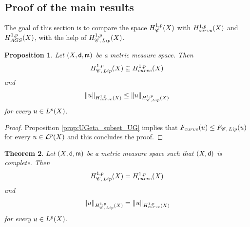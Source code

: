 \documentclass[12pt]{amsart}
\newcommand{\sfd}{{\sf d}}
\newcommand{\X}{{\rm X}}
\newcommand{\Lip}{{\rm Lip}}
\newcommand{\mm}{\mathfrak m}
\newcommand{\F}{{\rm F}}
\newtheorem{theorem}{Theorem}[section]
\newtheorem{proposition}[theorem]{Proposition}
\theoremstyle{definition}
\newcommand{\Chain}[1]{\mathscr{C}^{#1}}
\newcommand{\calL}[1]{\mathcal{L}^{#1}}
\newcommand{\HH}[2]{H^{1,#1}_{{\rm #2}}}
\renewcommand{\F}[1]{{\rm F}_{{\rm #1}}}
\begin{document}
\subsection{Proof of the main results}
\label{sec:proof_main_result}
The goal of this section is to compare the space $\HH{p}{\Chain{}}(\X)$ with $\HH{p}{curve}(\X)$ and $\HH{p}{AGS}(\X)$, with the help of $\HH{p}{\Chain{},\,\Lip}(\X)$.
\begin{proposition}
\label{prop:equivalence_H_noncomplete}
    Let $(\X,\sfd,\mm)$ be a metric measure space. Then 
    \begin{equation}
        \HH{p}{\Chain{},\, \Lip}(\X) \subseteq \HH{p}{curve}(\X)
    \end{equation}
    and
    \begin{equation}
        \|u \|_{\HH{p}{curve}(\X)} \le \|u \|_{\HH{p}{\Chain{}, \Lip}(\X)}
    \end{equation}
    for every $u\in L^p(\X)$.
\end{proposition}
%
\begin{proof}
   Proposition \ref{prop:UGeta_subset_UG} implies that $\F{curve}(u) \le \F{\Chain{},\,\Lip}(u)$ for every $u\in \calL{p}(\X)$ and this concludes the proof.
\end{proof}
%
%
\begin{theorem}
    \label{theo:density_energy_complete}
    Let $(\X,\sfd,\mm)$ be a metric measure space such that $(\X,\sfd)$ is complete. Then \begin{equation}
        \HH{p}{\Chain{},\, \Lip}(\X) = \HH{p}{curve}(\X)
    \end{equation}
    and
    \begin{equation}
        \|u \|_{\HH{p}{\Chain{},\, \Lip}(\X)}  = \|u \|_{\HH{p}{curve}(\X)}
    \end{equation}
    for every $u\in L^p(\X)$.
\end{theorem}
%
\end{document}

